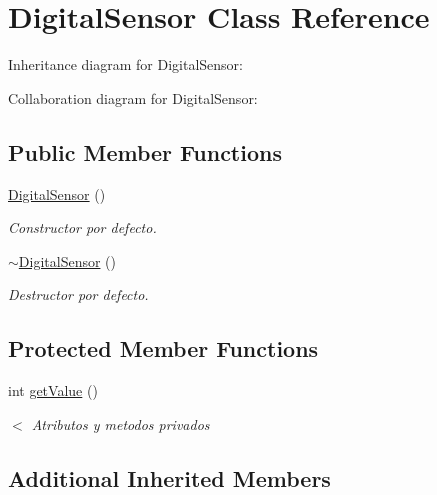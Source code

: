 \hypertarget{classDigitalSensor}{}\section{Digital\+Sensor Class Reference}
\label{classDigitalSensor}


Inheritance diagram for Digital\+Sensor\+:


Collaboration diagram for Digital\+Sensor\+:
\subsection*{Public Member Functions}
\begin{DoxyCompactItemize}
\item 
\mbox{\label{classDigitalSensor_a3c954d92f86c16d4832225ae39fed362}} 
\hyperlink{classDigitalSensor_a3c954d92f86c16d4832225ae39fed362}{Digital\+Sensor} ()
\begin{DoxyCompactList}\small\item\em Constructor por defecto. \end{DoxyCompactList}\item 
\mbox{\label{classDigitalSensor_ab74d9e7e77b4ea505cd42a364017ded0}} 
\hyperlink{classDigitalSensor_ab74d9e7e77b4ea505cd42a364017ded0}{$\sim$\+Digital\+Sensor} ()
\begin{DoxyCompactList}\small\item\em Destructor por defecto. \end{DoxyCompactList}\end{DoxyCompactItemize}
\subsection*{Protected Member Functions}
\begin{DoxyCompactItemize}
\item 
int \hyperlink{classDigitalSensor_ad89d8eb0cc6ed9458cfab2b90bf8d306}{get\+Value} ()
\begin{DoxyCompactList}\small\item\em $<$ Atributos y metodos privados \end{DoxyCompactList}\end{DoxyCompactItemize}
\subsection*{Additional Inherited Members}


